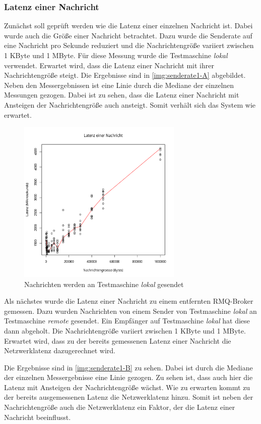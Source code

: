 \subsubsection{Latenz einer Nachricht}
\label{sec:oneMsgLatency}
Zunächst soll geprüft werden wie die Latenz einer einzelnen Nachricht ist. Dabei wurde auch die Größe einer Nachricht betrachtet. Dazu wurde die Senderate auf eine Nachricht pro Sekunde reduziert und die Nachrichtengröße variiert zwischen 1 KByte und 1 MByte. Für diese Messung wurde die Testmaschine \textit{lokal} verwendet. Erwartet wird, dass die Latenz einer Nachricht mit ihrer Nachrichtengröße steigt.
Die Ergebnisse sind in \autoref{img:senderate1-A} abgebildet. Neben den Messergebnissen ist eine Linie durch die Mediane der einzelnen Messungen gezogen. Dabei ist zu sehen, dass die Latenz einer Nachricht mit Ansteigen der Nachrichtengröße auch ansteigt. Somit verhält sich das System wie erwartet.
\begin{figure}
\center
  \includegraphics[width=0.7\textwidth]{images/measurement/rate-limit-1-A.pdf}
  \caption{Nachrichten werden an Testmaschine \textit{lokal} gesendet}
  \label{img:senderate1-A}
\end{figure}
Als nächstes wurde die Latenz einer Nachricht zu einem entfernten RMQ-Broker gemessen. Dazu wurden Nachrichten von einem Sender von Testmaschine \textit{lokal} an Testmaschine \textit{remote} gesendet. Ein Empfänger auf Testmaschine \textit{lokal} hat diese dann abgeholt. Die Nachrichtengröße variiert zwischen 1 KByte und 1 MByte. Erwartet wird, dass zu der bereits gemessenen Latenz einer Nachricht die Netzwerklatenz dazugerechnet wird.

Die Ergebnisse sind in \autoref{img:senderate1-B} zu sehen. Dabei ist durch die Mediane der einzelnen Messergebnisse eine Linie gezogen. Zu sehen ist, dass auch hier die Latenz mit Ansteigen der Nachrichtengröße wächst. Wie zu erwarten kommt zu der bereits ausgemessenen Latenz die Netzwerklatenz hinzu. 
Somit ist neben der Nachrichtengröße auch die Netzwerklatenz ein Faktor, der die Latenz einer Nachricht beeinflusst.

